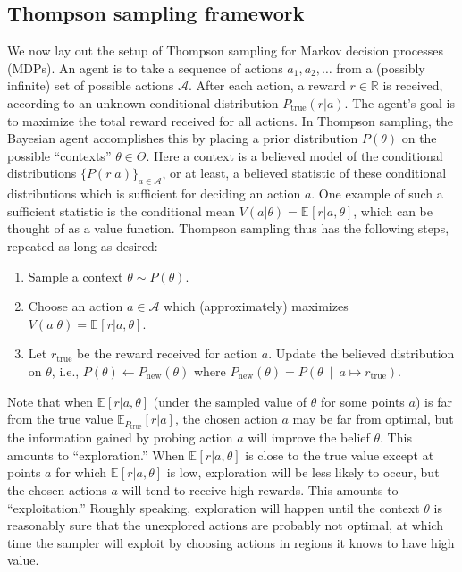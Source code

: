 \documentclass{article} %
\newcommand{\true}{{\textrm{true}}}
\newcommand{\rmnew}{{\textrm{new}}}
\newcommand{\Acal}{\mathcal{A}}
\newcommand{\R}{\mathbb{R}}
\newcommand{\pn}[1]{\left( #1 \right)}
\newcommand{\bkt}[1]{\left[ #1 \right]}
\newcommand{\Ebkt}[2][]{\mathbb{E}_{#1}\bkt{#2}}
\newcommand{\mvert}{\ \middle\vert\ }
\begin{document}
\subsection{Thompson sampling framework}
We now lay out the setup of Thompson sampling for Markov decision processes (MDPs).
An agent is to take a sequence of actions $a_1, a_2, \ldots$ from a (possibly infinite) set of possible actions $\Acal$.
After each action, a reward $r \in \R$ is received, according to an unknown conditional distribution $P_\true(r|a)$.
The agent's goal is to maximize the total reward received for all actions.
In Thompson sampling, the Bayesian agent accomplishes this by placing a prior distribution $P(\theta)$ on the possible ``contexts'' $\theta \in \Theta$.
Here a context is a believed model of the conditional distributions $\{P(r|a)\}_{a \in \Acal}$, or at least, a believed statistic of these conditional distributions which is sufficient for deciding an action $a$.
One example of such a sufficient statistic is the conditional mean $V(a|\theta) = \Ebkt{r|a,\theta}$, which can be thought of as a value function.
Thompson sampling thus has the following steps, repeated as long as desired:
\begin{enumerate}
  \item Sample a context $\theta \sim P(\theta)$.
  \item Choose an action $a \in \Acal$ which (approximately) maximizes $V(a|\theta) = \Ebkt{r|a,\theta}$.
  \item\label{itm:Thompson-conditioning}
    Let $r_\true$ be the reward received for action $a$.
    Update the believed distribution on $\theta$, i.e., $P(\theta) \gets P_\rmnew(\theta)$ where $P_\rmnew(\theta) = P\pn{\theta \mvert a \mapsto r_\true}$.
\end{enumerate}
Note that when $\Ebkt{r|a,\theta}$ (under the sampled value of $\theta$ for some points $a$) is far from the true value $\Ebkt[P_\true]{r|a}$, the chosen action $a$ may be far from optimal, but the information gained by probing action $a$ will improve the belief $\theta$.
This amounts to ``exploration.''
When $\Ebkt{r|a,\theta}$ is close to the true value except at points $a$ for which $\Ebkt{r|a,\theta}$ is low, exploration will be less likely to occur, but the chosen actions $a$ will tend to receive high rewards.
This amounts to ``exploitation.''
Roughly speaking, exploration will happen until the context $\theta$ is reasonably sure that the unexplored actions are probably not optimal, at which time the sampler will exploit by choosing actions in regions it knows to have high value.
\end{document}

